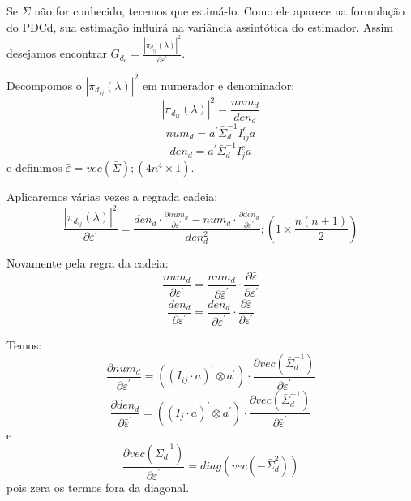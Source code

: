 \documentclass[a4paper,10pt]{article}
\begin{document}
Se $\Sigma$ não for conhecido, teremos que estimá-lo. Como ele aparece na formulação do PDCd, sua estimação influirá na variância assintótica do estimador. Assim desejamos encontrar $G_{d_e} = \frac{|\pi_{d_{ij}}(\lambda)|^{2}}{\partial \varepsilon^{'}}$.

Decompomos o $|\pi_{d_{ij}}(\lambda)|^{2}$ em numerador e denominador:
\begin{equation}
|\pi_{d_{ij}}(\lambda)|^{2} = \frac{num_{d}}{den_{d}}
\end{equation}
\begin{equation}
num_{d} = a^{'} \bar{\Sigma}_{d}^{-1} I_{ij}^{c} a
\end{equation}
\begin{equation}
den_{d} = a^{'} \bar{\Sigma}_{d}^{-1} I_{j}^{c} a
\end{equation}
e definimos $\bar{\varepsilon} = vec(\bar{\Sigma}); (4n^{4} \times 1)$.

Aplicaremos várias vezes a regrada cadeia:
\begin{equation}
\frac{|\pi_{d_{ij}}(\lambda)|^{2}}{\partial \varepsilon^{'}} = \frac{den_{d} \cdot \frac{\partial num_{d}}{\partial \varepsilon^{'}} - num_{d} \cdot \frac{\partial den_{d}}{\partial \varepsilon^{'}}}{den_{d}^{2}}; (1 \times \frac{n(n+1)}{2})
\end{equation}

Novamente pela regra da cadeia:
\begin{equation}
\frac{num_{d}}{\partial \varepsilon^{'}} = \frac{num_{d}}{\partial \bar{\varepsilon}^{'}} \cdot \frac{\partial \bar{\varepsilon}}{\partial \varepsilon^{'}}
\end{equation}
\begin{equation}
\frac{den_{d}}{\partial \varepsilon^{'}} = \frac{den_{d}}{\partial \bar{\varepsilon}^{'}} \cdot \frac{\partial \bar{\varepsilon}}{\partial \varepsilon^{'}}
\end{equation}

Temos: 
\begin{equation}
\frac{\partial num_{d}}{\partial \bar{\varepsilon}^{'}} = ((I_{ij} \cdot a)^{'} \otimes a^{'}) \cdot \frac{\partial vec(\bar{\Sigma}_{d}^{-1})}{\partial \bar{\varepsilon}^{'}}
\end{equation}
\begin{equation}
\frac{\partial den_{d}}{\partial \bar{\varepsilon}^{'}} = ((I_{j} \cdot a)^{'} \otimes a^{'}) \cdot \frac{\partial vec(\bar{\Sigma}_{d}^{-1})}{\partial \bar{\varepsilon}^{'}}
\end{equation}
e 
\begin{equation}
\frac{\partial vec(\bar{\Sigma}_{d}^{-1})}{\partial \bar{\varepsilon}^{'}} = diag(vec(-\bar{\Sigma}_{d}^{2}))
\end{equation}
pois zera os termos fora da diagonal.
\end{document}
